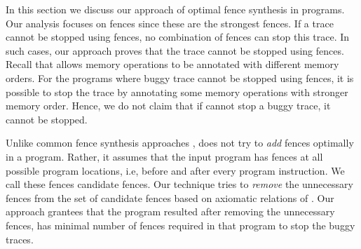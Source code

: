 

In this section we discuss our approach of optimal \mosc fence synthesis 
in \cc programs. 
Our analysis focuses on \mosc fences since these are the strongest \cc 
fences. If a trace cannot be stopped using \mosc fences, no combination 
of \cc fences can stop this trace. 
In such cases, our approach proves that the trace cannot be 
stopped using \cc fences.
Recall that \cc allows memory operations to be annotated with different 
memory orders. For the programs where buggy trace cannot be stopped 
using fences, it is possible to stop the trace by annotating some 
memory operations with stronger memory order.
Hence, we do not claim that if \ourtechnique cannot stop a buggy \cc 
trace, it cannot be stopped.

Unlike common fence synthesis approaches , 
\ourtechnique does not try to \emph{add} fences optimally in a program.
Rather, it assumes that the input program has \mosc 
fences at all possible program locations, i.e, before and after every 
program instruction. We call these fences candidate fences. Our technique 
tries to \emph{remove} the unnecessary fences from the set of candidate 
fences based on axiomatic relations of \cc. 
Our approach grantees that the program resulted after removing the 
unnecessary fences, has minimal number of \mosc fences required in that 
program to stop the buggy traces. 

